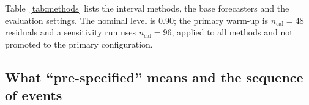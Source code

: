 Table~\ref{tab:methods} lists the interval methods, the base forecasters and the evaluation settings. The nominal level is 0.90; the primary warm-up is $n_{\mathrm{cal}}=48$ residuals and a sensitivity run uses $n_{\mathrm{cal}}=96$, applied to all methods and not promoted to the primary configuration.

\begin{table}[t]
\centering
\caption{Interval methods, base forecasters and evaluation settings (nominal level 0.90; rolling window 120; ACI step 0.02).}
\label{tab:methods}
\small
\fittable{}
\end{table}

\subsection{What ``pre-specified'' means and the sequence of events}\label{sec:prespec}

